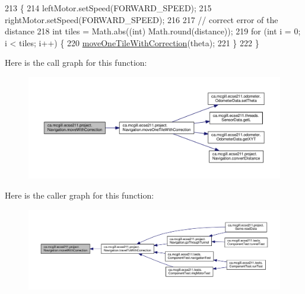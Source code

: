 \begin{DoxyCode}
213                                                                              \{
214     leftMotor.setSpeed(FORWARD\_SPEED);
215     rightMotor.setSpeed(FORWARD\_SPEED);
216 
217     \textcolor{comment}{// correct error of the distance}
218     \textcolor{keywordtype}{int} tiles = Math.abs((\textcolor{keywordtype}{int}) Math.round(distance));
219     \textcolor{keywordflow}{for} (\textcolor{keywordtype}{int} i = 0; i < tiles; i++) \{
220       \hyperlink{classca_1_1mcgill_1_1ecse211_1_1project_1_1_navigation_afbe677941e2bd44e35452e1eff508ae9}{moveOneTileWithCorrection}(theta);
221     \}
222   \}
\end{DoxyCode}
Here is the call graph for this function\+:
\nopagebreak
\begin{figure}[H]
\begin{center}
\leavevmode
\includegraphics[width=350pt]{classca_1_1mcgill_1_1ecse211_1_1project_1_1_navigation_a48eeb9ae2da23664421e8da5642054c7_cgraph}
\end{center}
\end{figure}
Here is the caller graph for this function\+:
\nopagebreak
\begin{figure}[H]
\begin{center}
\leavevmode
\includegraphics[width=350pt]{classca_1_1mcgill_1_1ecse211_1_1project_1_1_navigation_a48eeb9ae2da23664421e8da5642054c7_icgraph}
\end{center}
\end{figure}
\mbox{\label{classca_1_1mcgill_1_1ecse211_1_1project_1_1_navigation_a1a808e665b8dd5b8e79b0580724d239c}} 
